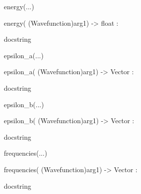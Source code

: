 \documentclass[letterpaper,10pt,english]{sphinxmanual}
\begin{document}
\begin{description}
\begin{description}
\begin{DUlineblock}{0em}
\begin{DUlineblock}{\DUlineblockindent}
\begin{DUlineblock}{\DUlineblockindent}
\item[] 
\end{DUlineblock}
\end{DUlineblock}
\item[] energy(...)
\item[]
\begin{DUlineblock}{\DUlineblockindent}
\item[] energy( (Wavefunction)arg1) -\textgreater{} float :
\item[]
\begin{DUlineblock}{\DUlineblockindent}
\item[] docstring
\item[] 
\end{DUlineblock}
\end{DUlineblock}
\item[] epsilon\_a(...)
\item[]
\begin{DUlineblock}{\DUlineblockindent}
\item[] epsilon\_a( (Wavefunction)arg1) -\textgreater{} Vector :
\item[]
\begin{DUlineblock}{\DUlineblockindent}
\item[] docstring
\item[] 
\end{DUlineblock}
\end{DUlineblock}
\item[] epsilon\_b(...)
\item[]
\begin{DUlineblock}{\DUlineblockindent}
\item[] epsilon\_b( (Wavefunction)arg1) -\textgreater{} Vector :
\item[]
\begin{DUlineblock}{\DUlineblockindent}
\item[] docstring
\item[] 
\end{DUlineblock}
\end{DUlineblock}
\item[] frequencies(...)
\item[]
\begin{DUlineblock}{\DUlineblockindent}
\item[] frequencies( (Wavefunction)arg1) -\textgreater{} Vector :
\item[]
\begin{DUlineblock}{\DUlineblockindent}
\item[] docstring
\item[] 

\end{DUlineblock}
\end{DUlineblock}
\end{DUlineblock}
\end{description}
\end{description}
\end{document}
